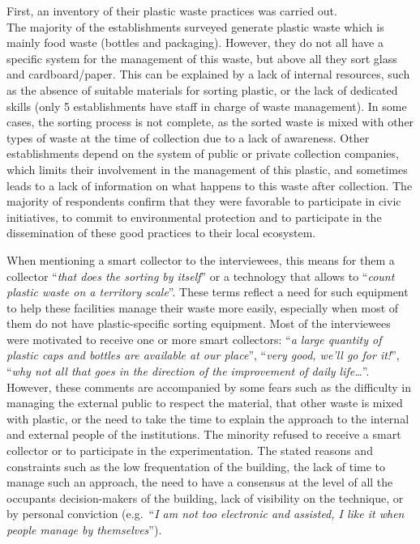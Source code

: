 \documentclass[
  11pt,
]{article}
\begin{document}
First, an inventory of their plastic waste practices was carried out.\\
The majority of the establishments surveyed generate plastic waste which
is mainly food waste (bottles and packaging). However, they do not all
have a specific system for the management of this waste, but above all
they sort glass and cardboard/paper. This can be explained by a lack of
internal resources, such as the absence of suitable materials for
sorting plastic, or the lack of dedicated skills (only 5 establishments
have staff in charge of waste management). In some cases, the sorting
process is not complete, as the sorted waste is mixed with other types
of waste at the time of collection due to a lack of awareness. Other
establishments depend on the system of public or private collection
companies, which limits their involvement in the management of this
plastic, and sometimes leads to a lack of information on what happens to
this waste after collection. The majority of respondents confirm that
they were favorable to participate in civic initiatives, to commit to
environmental protection and to participate in the dissemination of
these good practices to their local ecosystem.

When mentioning a smart collector to the interviewees, this means for
them a collector ``\emph{that does the sorting by itself}'' or a
technology that allows to ``\emph{count plastic waste on a territory
scale}''. These terms reflect a need for such equipment to help these
facilities manage their waste more easily, especially when most of them
do not have plastic-specific sorting equipment. Most of the interviewees
were motivated to receive one or more smart collectors: ``\emph{a large
quantity of plastic caps and bottles are available at our place}'',
``\emph{very good, we'll go for it!}'', ``\emph{why not all that goes in
the direction of the improvement of daily life\ldots{}}''. However,
these comments are accompanied by some fears such as the difficulty in
managing the external public to respect the material, that other waste
is mixed with plastic, or the need to take the time to explain the
approach to the internal and external people of the institutions. The
minority refused to receive a smart collector or to participate in the
experimentation. The stated reasons and constraints such as the low
frequentation of the building, the lack of time to manage such an
approach, the need to have a consensus at the level of all the occupants
decision-makers of the building, lack of visibility on the technique, or
by personal conviction (e.g.~``\emph{I am not too electronic and
assisted, I like it when people manage by themselves}'').
\end{document}
